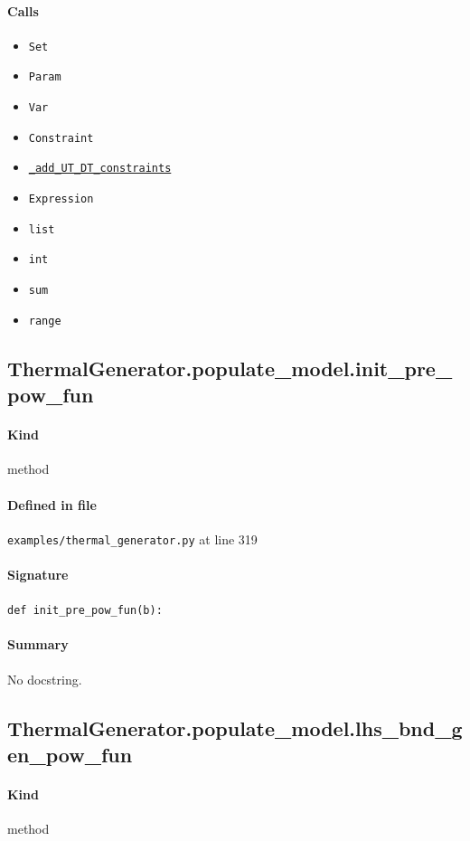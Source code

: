 \documentclass[11pt]{report}
\begin{document}
\paragraph{Calls}
\begin{itemize}[leftmargin=*]
  \item \texttt{Set}
  \item \texttt{Param}
  \item \texttt{Var}
  \item \texttt{Constraint}
  \item \hyperref[def:examples-thermal_generator.py:ThermalGenerator._add_UT_DT_constraints:L174]{\texttt{\_add\_UT\_DT\_constraints}}
  \item \texttt{Expression}
  \item \texttt{list}
  \item \texttt{int}
  \item \texttt{sum}
  \item \texttt{range}
\end{itemize}
\subsection{ThermalGenerator.populate\_model.init\_pre\_pow\_fun}
\label{def:examples-thermal_generator.py:ThermalGenerator.populate_model.init_pre_pow_fun:L319}
\paragraph{Kind} method
\paragraph{Defined in file} \texttt{examples/thermal\_generator.py} at line 319
\paragraph{Signature} \texttt{def init\_pre\_pow\_fun(b):}
\paragraph{Summary} No docstring.
\subsection{ThermalGenerator.populate\_model.lhs\_bnd\_gen\_pow\_fun}
\label{def:examples-thermal_generator.py:ThermalGenerator.populate_model.lhs_bnd_gen_pow_fun:L350}
\paragraph{Kind} method
\end{document}
